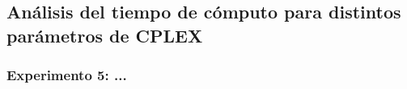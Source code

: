 \documentclass{article}
\begin{document}
\subsection{Análisis del tiempo de cómputo para distintos parámetros de CPLEX}

\subsubsection{Experimento 5: ...}
\end{document}
